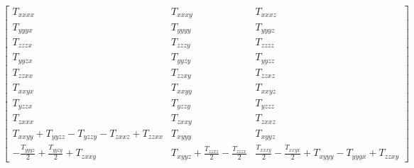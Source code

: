 \documentclass[fleqn,8pt,landscape]{jsarticle}
\begin{document}
\begin{align*}
\begin{bmatrix} T_{xxxx} & T_{xxxy} & T_{xxxz} \\ T_{yyyx} & T_{yyyy} & T_{yyyz} \\ T_{zzzx} & T_{zzzy} & T_{zzzz} \\ T_{yyzx} & T_{yyzy} & T_{yyzz} \\ T_{zzxx} & T_{zzxy} & T_{zzxz} \\ T_{xxyx} & T_{xxyy} & T_{xxyz} \\ T_{yzzx} & T_{yzzy} & T_{yzzz} \\ T_{zxxx} & T_{zxxy} & T_{zxxz} \\ T_{xxyy} + T_{yyzz} - T_{yzzy} - T_{zxxz} + T_{zzxx} & T_{xyyy} & T_{xyyz} \\ - \frac{T_{yyyz}}{2} + \frac{T_{yyzy}}{2} + T_{zxxy} & T_{xyyz} + \frac{T_{zzxz}}{2} - \frac{T_{zzzx}}{2} & \frac{T_{xxxy}}{2} - \frac{T_{xxyx}}{2} + T_{xyyy} - T_{yyyx} + T_{zzxy} \end{bmatrix}
\end{align*}
\end{document}
